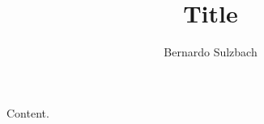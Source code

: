 \documentclass[titlepage]{article}
\title{Title}
\author{Bernardo Sulzbach}
\begin{document}
\maketitle

Content.
\end{document}
